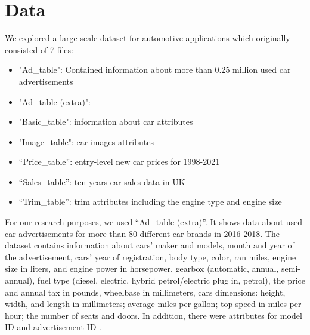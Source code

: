 \section{Data}
We explored a large-scale dataset for automotive applications which originally consisted of 7 files:
\begin{itemize}
    \item "Ad\_table": Contained information about more than 0.25 million used car advertisements
    \item "Ad\_table (extra)":
    \item "Basic\_table": information about car attributes
    \item "Image\_table": car images attributes
    \item “Price\_table”: entry-level new car prices for 1998-2021
    \item “Sales\_table”: ten years car sales data in UK
    \item “Trim\_table”: trim attributes including the engine type and engine size
\end{itemize}
For our research purposes, we used “Ad\_table (extra)”.
It shows data about used car advertisements for more than 80 different car brands in 2016-2018.
The dataset contains information about cars' maker and models, month and year of the advertisement,
cars' year of registration, body type, color, ran miles, engine size in liters, and engine power in horsepower,
gearbox (automatic, annual, semi-annual), fuel type (diesel, electric, hybrid petrol/electric plug in, petrol),
the price and annual tax in pounds, wheelbase in millimeters, cars dimensions:
height, width, and length in millimeters; average miles per gallon; top speed in miles per hour; the number of seats and doors.
In addition, there were attributes for model ID and advertisement ID \autocite{huangDVMCARLargescaleAutomotive2022}.
